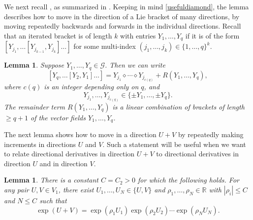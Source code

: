 \documentclass[reqno, 11pt]{amsart}
\newtheorem{lemma}[theorem]{Lemma}
\theoremstyle{definition}
\theoremstyle{remark}
\numberwithin{theorem}{section}
\numberwithin{equation}{section}
\begin{document}
We next recall \cite[Lemma 19.1.4]{BLU}, as summarized in \cite[page 717]{BLU}. Keeping in mind \eqref{usefuldiamond}, the lemma describes how to move in the direction of a Lie bracket of many directions, by moving repeatedly backwards and forwards in the individual directions. Recall that an iterated bracket is of length $k$ with entries $Y_1,\ldots, Y_q$ if it is of the form $[Y_{j_1},\ldots[Y_{j_{k-1}}, Y_{j_k}]\ldots]$ for some multi-index $(j_1,\ldots, j_k)\in \{1,\ldots, q\}^k$.

\begin{lemma}\label{diamondlemma}
Suppose $Y_{1}, \ldots, Y_{q} \in \mathcal{G}$. Then we can write 
\[ [Y_{q}, \ldots [Y_{2}, Y_{1}]\ldots]=Y_{j_{1}}\diamond \cdots \diamond Y_{j_{c(q)}}+R(Y_{1}, \ldots, Y_{q}),\]
where $c(q)$ is an integer depending only on $q$, and
\[Y_{j_{1}}, \ldots, Y_{j_{c(q)}} \in \{ \pm Y_{1}, \ldots, \pm Y_{q}\}.\]
The remainder term $R(Y_{1}, \ldots, Y_{q})$ is a linear combination of brackets of length $\geq q+1$ of the vector fields $Y_{1}, \ldots, Y_{q}$.
\end{lemma}

The next lemma shows how to move in a direction $U+V$ by repeatedly making increments in directions $U$ and $V$. Such a statement will be useful when we want to relate directional derivatives in direction $U+V$ to directional derivatives in direction $U$ and in direction $V$.

\begin{lemma}\label{ballboxtype}
There is a constant $C=C_{2}>0$ for which the following holds. For any pair $U, V\in V_{1}$, there exist $U_{1}, \ldots , U_{N} \in \{U, V\}$ and $\rho_{1}, \ldots, \rho_{N}\in \mathbb{R}$ with $|\rho_{i}|\leq C$ and $N\leq C$ such that
\[ \exp(U+V)=\exp(\rho_{1} U_{1})\exp(\rho_{2} U_{2})\cdots \exp(\rho_{N} U_{N}).\]
\end{lemma}
\end{document}
